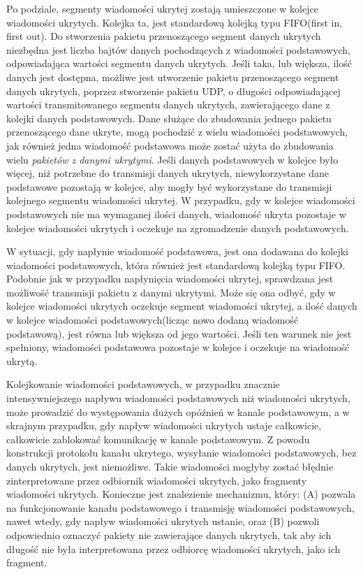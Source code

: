 \documentclass[a4paper, twoside, 12pt]{report}
\begin{document}
    Po podziale, segmenty wiadomości ukrytej zostają umieszczone w kolejce wiadomości
    ukrytych. Kolejka ta, jest standardową kolejką typu FIFO(first in, first out).
    Do stworzenia pakietu przenoszącego segment danych ukrytych niezbędna jest
    liczba bajtów danych pochodzących z wiadomości podstawowych, odpowiadająca
    wartości segmentu danych ukrytych. Jeśli taka, lub większa, ilość danych jest dostępna,
    możliwe jest utworzenie pakietu przenoszącego segment danych ukrytych, poprzez
    stworzenie pakietu UDP, o długości odpowiadającej wartości transmitowanego segmentu danych
    ukrytych, zawierającego dane z kolejki danych podstawowych. Dane służące do zbudowania
    jednego pakietu przenoszącego dane ukryte, mogą pochodzić z wielu wiadomości
    podstawowych, jak również jedna wiadomość podstawowa może zostać użyta do zbudowania
    wielu \emph{pakietów z danymi ukrytymi}. Jeśli danych podstawowych
    w kolejce było więcej, niż potrzebne do transmisji danych ukrytych, niewykorzystane
    dane podstawowe pozostają w kolejce, aby mogły być wykorzystane do transmisji
    kolejnego segmentu wiadomości ukrytej.
    W przypadku, gdy w kolejce wiadomości podstawowych nie ma wymaganej ilości
    danych, wiadomość ukryta pozostaje w kolejce wiadomości ukrytych i oczekuje
    na zgromadzenie danych podstawowych.

    W sytuacji, gdy napłynie wiadomość podstawowa, jest ona dodawana do kolejki
    wiadomości podstawowych, która również jest standardową kolejką typu FIFO.
    Podobnie jak w przypadku napłynięcia wiadomości ukrytej, sprawdzana jest możliwość
    transmisji pakietu z danymi ukrytymi. Może się ona odbyć, gdy w kolejce wiadomości
    ukrytych oczekuje segment wiadomości ukrytej, a ilość danych w kolejce wiadomości
    podstawowych(licząc nowo dodaną wiadomość podstawową), jest równa lub większa
    od jego wartości. Jeśli ten warunek nie jest spełniony, wiadomości podstawowa
    pozostaje w kolejce i oczekuje na wiadomość ukrytą.

    Kolejkowanie wiadomości podstawowych, w przypadku znacznie intensywniejszego
    napływu wiadomości podstawowych niż wiadomości ukrytych, może prowadzić do
    występowania dużych opóźnień w kanale podstawowym, a w skrajnym przypadku,
    gdy napływ wiadomości ukrytych ustaje całkowicie, całkowicie zablokować
    komunikację w kanale podstawowym. Z powodu konstrukcji protokołu kanału
    ukrytego, wysyłanie wiadomości podstawowych, bez danych ukrytych, jest niemożliwe.
    Takie wiadomości mogłyby zostać błędnie zinterpretowane przez odbiornik wiadomości
    ukrytych, jako fragmenty wiadomości ukrytych. Konieczne jest znalezienie mechanizmu,
    który: (A) pozwala na funkcjonowanie kanału podstawowego i transmisję wiadomości
    podstawowych, nawet wtedy, gdy napływ wiadomości ukrytych ustanie, oraz (B)
    pozwoli odpowiednio oznaczyć pakiety nie zawierające danych ukrytych, tak aby ich długość
    nie była interpretowana przez odbiorcę wiadomości ukrytych, jako ich fragment.
\end{document}
